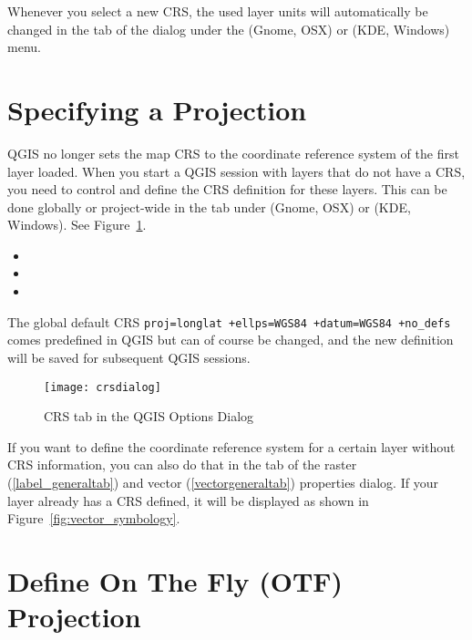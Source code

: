 Whenever you select a new CRS, the used layer units will automatically be
changed in the  tab of the
 dialog under the
 (Gnome, OSX) or  (KDE, Windows)
menu.

\section{Specifying a Projection}
\label{sec:projection-specifying}

QGIS no longer sets the map CRS to the coordinate reference system of the
first layer loaded. When you start a QGIS session with layers that do not
have a CRS, you need to control and define the CRS definition for these
layers. This can be done globally or project-wide in the  tab under
 \arrow {} (Gnome, OSX)
or  \arrow {} (KDE, Windows).
See Figure~\ref{fig:crsdialog}.

\begin{itemize}[label=--]
\item {}
\item {}
\item {}
\end{itemize}

The global default CRS \texttt{proj=longlat +ellps=WGS84 +datum=WGS84
+no\_defs} comes predefined in QGIS but can of course be changed, and the new
definition will be saved for subsequent QGIS sessions.

\begin{figure}[ht]
   \centering
   \texttt{[image: crsdialog]}
   \caption{CRS tab in the QGIS Options Dialog \nixcaption}\label{fig:crsdialog}
\end{figure}

If you want to define the coordinate reference system for a certain layer
without CRS information, you can also do that in the  tab of the
raster (\ref{label_generaltab}) and vector (\ref{vectorgeneraltab}) properties
dialog. If your layer already has a CRS defined, it
will be displayed as shown in Figure~\ref{fig:vector_symbology}.

\section{Define On The Fly (OTF) Projection}\label{label_projstart}

